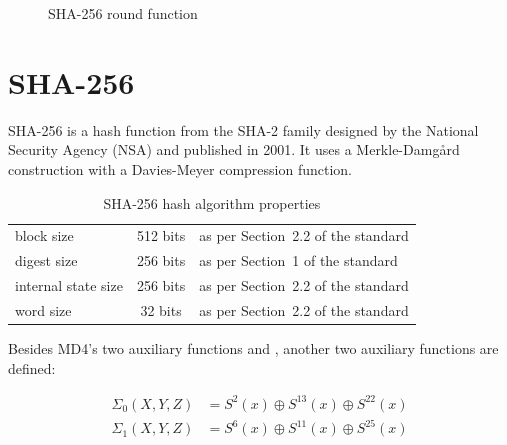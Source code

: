 \begin{figure}[p]
\begin{center}
    \caption{SHA-256 round function}
    \label{fig:sha256-round-function}
  \end{center}
\end{figure}

\section{SHA-256}
\label{sec:dc-sha-256}
%
SHA-256 is a hash function from the SHA-2 family designed by the National Security Agency (NSA)
and published in 2001. It uses a Merkle-Damg\aa{}rd construction with a Davies-Meyer
compression function.

\begin{table}[h]
  \begin{center}
    \begin{tabular}{lcl}
      block size           & 512 bits       & as per Section~2.2 of the standard \\
      digest size          & 256 bits       & as per Section~1 of the standard \\
      internal state size  & 256 bits       & as per Section~2.2 of the standard \\
      word size            & 32 bits        & as per Section~2.2 of the standard \\
    \end{tabular}
    \caption{SHA-256 hash algorithm properties}
    \label{tab:sha256}
  \end{center}
\end{table}

Besides MD4's two auxiliary functions  and ,
another two auxiliary functions are defined:

\begin{align}
  \Sigma_0(X,Y,Z) &= S^2(x) \oplus S^{13}(x) \oplus S^{22}(x) \\
  \Sigma_1(X,Y,Z) &= S^6(x) \oplus S^{11}(x) \oplus S^{25}(x)
\end{align}

